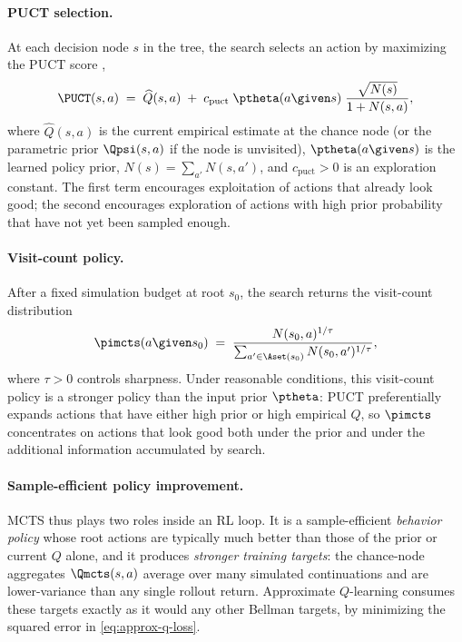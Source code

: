 \paragraph{PUCT selection.}
At each decision node $s$ in the tree, the search selects an action by
maximizing the PUCT score \citep{silver2017alphagozero},
\begin{equation}
\PUCT(s, a) \;=\; \widehat Q(s, a)
\;+\; c_{\mathrm{puct}} \;\ptheta(a \given s)\;
\frac{\sqrt{N(s)}}{1 + N(s, a)},
\label{eq:puct-bg}
\end{equation}
where $\widehat Q(s, a)$ is the current empirical estimate at the
chance node (or the parametric prior $\Qpsi(s, a)$ if the node is
unvisited), $\ptheta(a \given s)$ is the learned policy prior,
$N(s) = \sum_{a'} N(s, a')$, and $c_{\mathrm{puct}} > 0$ is an
exploration constant. The first term encourages exploitation of actions
that already look good; the second encourages exploration of actions
with high prior probability that have not yet been sampled enough.

\paragraph{Visit-count policy.}
After a fixed simulation budget at root $s_0$, the search returns the
visit-count distribution
\begin{equation}
\pimcts(a \given s_0)
\;=\; \frac{N(s_0, a)^{1/\tau}}
            {\sum_{a' \in \Aset(s_0)} N(s_0, a')^{1/\tau}},
\label{eq:visit-policy}
\end{equation}
where $\tau > 0$ controls sharpness. Under reasonable conditions, this
visit-count policy is a stronger policy than the input prior $\ptheta$:
PUCT preferentially expands actions that have either high prior or high
empirical $Q$, so $\pimcts$ concentrates on actions that look good both
under the prior and under the additional information accumulated by
search.

\paragraph{Sample-efficient policy improvement.}
MCTS thus plays two roles inside an RL loop. It is a sample-efficient
\emph{behavior policy} whose root actions are typically much better than
those of the prior or current $Q$ alone, and it produces
\emph{stronger training targets}: the chance-node aggregates
$\Qmcts(s, a)$ average over many simulated continuations and are
lower-variance than any single rollout return. Approximate $Q$-learning
consumes these targets exactly as it would any other Bellman targets,
by minimizing the squared error in \eqref{eq:approx-q-loss}.

